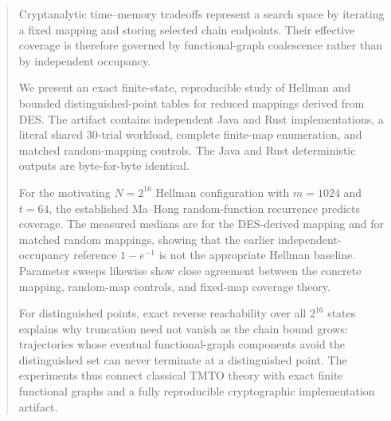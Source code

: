 \begin{abstract}
Cryptanalytic time--memory tradeoffs represent a search space by iterating a
fixed mapping and storing selected chain endpoints. Their effective coverage is
therefore governed by functional-graph coalescence rather than by independent
occupancy.

We present an exact finite-state, reproducible study of Hellman and bounded
distinguished-point tables for reduced mappings derived from DES. The artifact
contains independent Java and Rust implementations, a literal shared 30-trial
workload, complete finite-map enumeration, and matched random-mapping controls.
The Java and Rust deterministic outputs are byte-for-byte identical.

For the motivating $N=2^{16}$ Hellman configuration with $m=1024$ and $t=64$,
the established Ma--Hong random-function recurrence predicts \StressMH{}
coverage. The measured medians are \StressDES{} for the DES-derived mapping
and \StressRandom{} for matched random mappings, showing that the earlier
independent-occupancy reference $1-e^{-1}$ is not the appropriate Hellman
baseline. Parameter sweeps likewise show close agreement between the concrete
mapping, random-map controls, and fixed-map coverage theory.

For distinguished points, exact reverse reachability over all $2^{16}$ states
explains why truncation need not vanish as the chain bound grows: trajectories
whose eventual functional-graph components avoid the distinguished set can
never terminate at a distinguished point. The experiments thus connect
classical TMTO theory with exact finite functional graphs and a fully
reproducible cryptographic implementation artifact.
\end{abstract}

